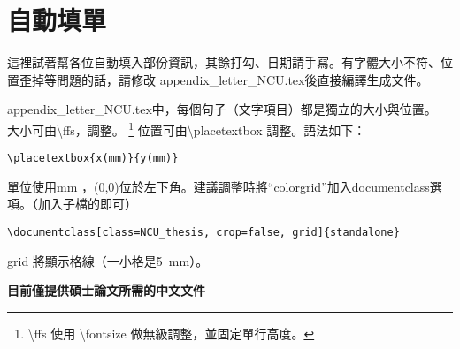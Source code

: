\documentclass[class=NCU_thesis, crop=false]{standalone}
\begin{document}
\chapter{自動填單}
這裡試著幫各位自動填入部份資訊，其餘打勾、日期請手寫。有字體大小不符、位置歪掉等問題的話，請修改 appendix\_letter\_NCU.tex後直接編譯生成文件。

appendix\_letter\_NCU.tex中，每個句子（文字項目）都是獨立的大小與位置。 大小可由\textbackslash{}ffs，調整。
\footnote{\textbackslash{}ffs 使用 \textbackslash{}fontsize 做無級調整，並固定單行高度。 }
位置可由\textbackslash{}placetextbox 調整。語法如下：
\begin{lstlisting}[style=LatexStyle,caption={}]
\placetextbox{x(mm)}{y(mm)}
\end{lstlisting}
單位使用mm ，(0,0)位於左下角。建議調整時將``colorgrid''加入documentclass選項。（加入子檔的即可）
\begin{lstlisting}[style=LatexStyle,caption={}]
\documentclass[class=NCU_thesis, crop=false, grid]{standalone}
\end{lstlisting}
grid 將顯示格線（一小格是\SI{5}{\milli\metre}）。

\begin{center}
{ \noindent\color{red}\bfseries\Large 目前僅提供碩士論文所需的中文文件}
\end{center}

\cleardoublepage
\pagestyle{empty}
\sffamily





\pagestyle{fancy}
\end{document}
